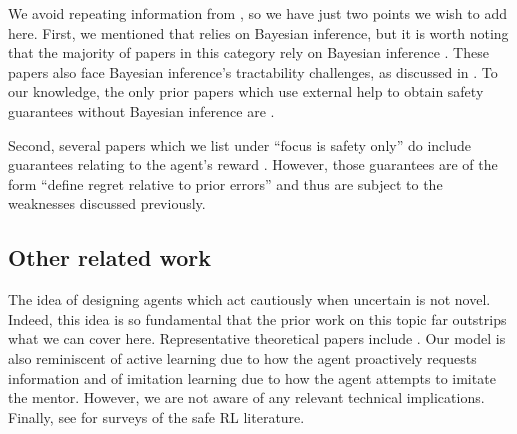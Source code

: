 We avoid repeating information from , so we have just two points we wish to add here. First, we mentioned that \citet{kosoy_delegative_2019} relies on Bayesian inference, but it is worth noting that the majority of papers in this category rely on Bayesian inference \citep{cohen_pessimism_2020, cohen_curiosity_2021, mindermann_active_2018}. These papers also face Bayesian inference's tractability challenges, as discussed in . To our knowledge, the only prior papers which use external help to obtain safety guarantees without Bayesian inference are \citep{maillard_active_2019,plaut_avoiding_2024}.

Second, several papers which we list under ``focus is safety only'' do include guarantees relating to the agent's reward \citep{cohen_pessimism_2020, cohen_curiosity_2021}. However, those guarantees are of the form ``define regret relative to prior errors'' and thus are subject to the weaknesses discussed previously.

\subsection{Other related work} 

The idea of designing agents which act cautiously when uncertain is not novel. Indeed, this idea is so fundamental that the prior work on this topic far outstrips what we can cover here. Representative theoretical papers include \citet{cortes2018online, hadfield-menell_inverse_2017, li2008knows}. Our model is also reminiscent of active learning \citep{hanneke2014active} due to how the agent proactively requests information and of imitation learning \citep{osa_algorithmic_2018} due to how the agent attempts to imitate the mentor. However, we are not aware of any relevant technical implications. Finally, see \citet{garcia_comprehensive_2015,gu_review_2024, krasowski_provably_2023} for surveys of the safe RL literature.

